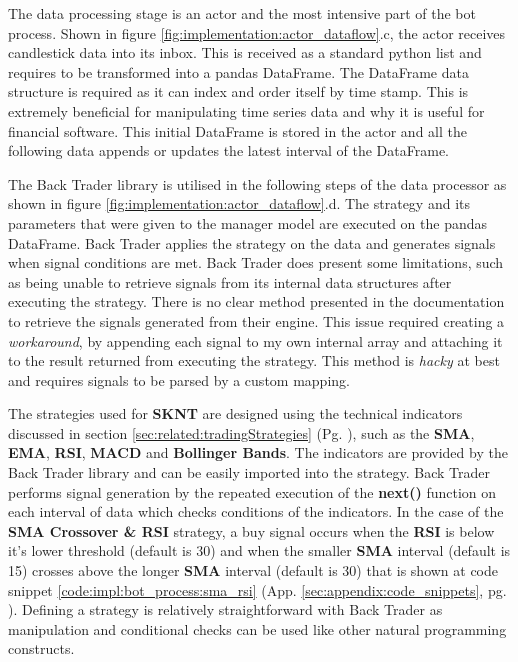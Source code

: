 \noindent The data processing stage is an actor and the most intensive part of the bot process. Shown in figure \ref{fig:implementation:actor_dataflow}.c, the actor receives candlestick data into its inbox. This is received as a standard python list and requires to be transformed into a pandas DataFrame. The DataFrame data structure is required as it can index and order itself by time stamp. This is extremely beneficial for manipulating time series data and why it is useful for financial software. This initial DataFrame is stored in the actor and all the following data appends or updates the latest interval of the DataFrame. 

The Back Trader library is utilised in the following steps of the data processor as shown in figure \ref{fig:implementation:actor_dataflow}.d. The strategy and its parameters that were given to the manager model are executed on the pandas DataFrame. Back Trader applies the strategy on the data and generates signals when signal conditions are met. Back Trader does present some limitations, such as being unable to retrieve signals from its internal data structures after executing the strategy. There is no clear method presented in the documentation to retrieve the signals generated from their engine. This issue required creating a \textit{workaround}, by appending each signal to my own internal array and attaching it to the result returned from executing the strategy. This method is \textit{hacky} at best and requires signals to be parsed by a custom mapping.


The strategies used for \textbf{SKNT} are designed using the technical indicators discussed in section \ref{sec:related:tradingStrategies} (Pg. \pageref{sec:related:tradingStrategies}), such as the \textbf{SMA}, \textbf{EMA}, \textbf{RSI}, \textbf{MACD} and \textbf{Bollinger Bands}. The indicators are provided by the Back Trader library \cite{MISC:BACKTRADER} and can be easily imported into the strategy. Back Trader performs signal generation by the repeated execution of the \textbf{next()} function on each interval of data which checks conditions of the indicators. In the case of the \textbf{SMA Crossover \& RSI} strategy, a buy signal occurs when the \textbf{RSI} is below it's lower threshold (default is 30) and when the smaller \textbf{SMA} interval (default is 15) crosses above the longer \textbf{SMA} interval (default is 30) that is shown at code snippet \ref{code:impl:bot_process:sma_rsi} (App. \ref{sec:appendix:code_snippets}, pg. \pageref{code:impl:bot_process:sma_rsi}). Defining a strategy is relatively straightforward with Back Trader as manipulation and conditional checks can be used like other natural programming constructs.

